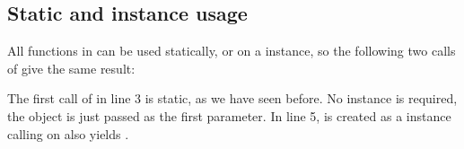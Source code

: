 \documentclass[a4paper,10pt,english]{sphinxmanual}
\begin{document}
\subsection{Static and instance usage}
\label{\detokenize{README:static-and-instance-usage}}
\sphinxAtStartPar
All functions in  can be used statically, or on a \sphinxhyphen{}instance, so the following two calls of {\hyperref[\detokenize{README:the-path-parameter}]{}} give the same result:

\begin{sphinxVerbatim}[commandchars=\\\{\},numbers=left,firstnumber=1,stepnumber=1]
  \PYG{p}{[}  \PYG{p}{[}   \PYG{p}{]} \PYG{p}{[}  \PYG{p}{]}\PYG{p}{]}
 
  
\end{sphinxVerbatim}

\sphinxAtStartPar
The first call of {\hyperref[\detokenize{README:the-path-parameter}]{}} in line 3 is static, as we have seen before. No  instance is required, the object  is just passed as the first parameter. In line 5,  is created as a \sphinxhyphen{}instance \textendash{} calling {\hyperref[\detokenize{README:the-path-parameter}]{}} on  also yields .
\end{document}
